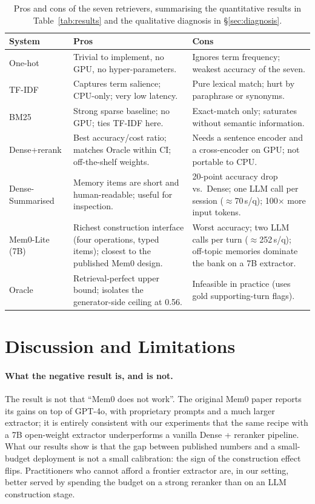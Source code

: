 \documentclass[11pt]{article}
\begin{document}
\begin{table}[t!]
\centering
\footnotesize
\setlength{\tabcolsep}{6pt}
\renewcommand{\arraystretch}{1.25}
\begin{tabular}{@{}p{2.2cm} p{5.8cm} p{7.5cm}@{}}
\toprule
\textbf{System} & \textbf{Pros} & \textbf{Cons} \\
\midrule
One-hot          & Trivial to implement, no GPU, no hyper-parameters. & Ignores term frequency; weakest accuracy of the seven. \\
TF-IDF           & Captures term salience; CPU-only; very low latency. & Pure lexical match; hurt by paraphrase or synonyms. \\
BM25             & Strong sparse baseline; no GPU; ties TF-IDF here. & Exact-match only; saturates without semantic information. \\
Dense+rerank     & Best accuracy/cost ratio; matches Oracle within CI; off-the-shelf weights. & Needs a sentence encoder and a cross-encoder on GPU; not portable to CPU. \\
Dense-Summarised & Memory items are short and human-readable; useful for inspection. & 20-point accuracy drop vs.\ Dense; one LLM call per session ($\approx$70\,s/q); 100$\times$ more input tokens. \\
Mem0-Lite (7B)   & Richest construction interface (four operations, typed items); closest to the published Mem0 design. & Worst accuracy; two LLM calls per turn ($\approx$252\,s/q); off-topic memories dominate the bank on a 7B extractor. \\
Oracle           & Retrieval-perfect upper bound; isolates the generator-side ceiling at 0.56. & Infeasible in practice (uses gold supporting-turn flags). \\
\bottomrule
\end{tabular}
\caption{Pros and cons of the seven retrievers, summarising the
quantitative results in Table~\ref{tab:results} and the qualitative
diagnosis in \S\ref{sec:diagnosis}.}
\label{tab:proscons}
\end{table}

\section{Discussion and Limitations}
\label{sec:discuss}

\paragraph{What the negative result is, and is not.}
The result is not that ``Mem0 does not work''. The original Mem0
paper reports its gains on top of GPT-4o, with proprietary prompts
and a much larger extractor; it is entirely consistent with our
experiments that the same recipe with a 7B open-weight extractor
underperforms a vanilla Dense + reranker pipeline. What our results
show is that the gap between published numbers and a small-budget
deployment is not a small calibration: the sign of the construction
effect flips. Practitioners who cannot afford a frontier extractor
are, in our setting, better served by spending the budget on a
strong reranker than on an LLM construction stage.
\end{document}

